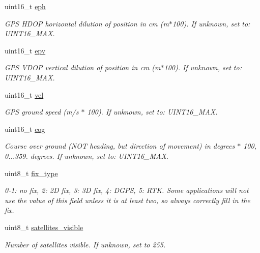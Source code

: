 \begin{DoxyCompactItemize}
uint16\+\_\+t \hyperlink{struct____mavlink__gps__raw__int__t_ad7ec0749ffe37d3ada65b701be2cd305}{eph}
\begin{DoxyCompactList}\small\item\em G\+P\+S H\+D\+O\+P horizontal dilution of position in cm (m$\ast$100). If unknown, set to\+: U\+I\+N\+T16\+\_\+\+M\+A\+X. \end{DoxyCompactList}\item 
uint16\+\_\+t \hyperlink{struct____mavlink__gps__raw__int__t_a0d50bc6cc0e56d9f49885e3e550ec944}{epv}
\begin{DoxyCompactList}\small\item\em G\+P\+S V\+D\+O\+P vertical dilution of position in cm (m$\ast$100). If unknown, set to\+: U\+I\+N\+T16\+\_\+\+M\+A\+X. \end{DoxyCompactList}\item 
uint16\+\_\+t \hyperlink{struct____mavlink__gps__raw__int__t_a77e8cbdbf554637e4fbbdaaabd562eaf}{vel}
\begin{DoxyCompactList}\small\item\em G\+P\+S ground speed (m/s $\ast$ 100). If unknown, set to\+: U\+I\+N\+T16\+\_\+\+M\+A\+X. \end{DoxyCompactList}\item 
uint16\+\_\+t \hyperlink{struct____mavlink__gps__raw__int__t_adbe4dfbea17d1fd08a0841ce29e32637}{cog}
\begin{DoxyCompactList}\small\item\em Course over ground (N\+O\+T heading, but direction of movement) in degrees $\ast$ 100, 0...359. degrees. If unknown, set to\+: U\+I\+N\+T16\+\_\+\+M\+A\+X. \end{DoxyCompactList}\item 
uint8\+\_\+t \hyperlink{struct____mavlink__gps__raw__int__t_ae014afb6eea2b6033ebde37c79e120f2}{fix\+\_\+type}
\begin{DoxyCompactList}\small\item\em 0-\/1\+: no fix, 2\+: 2\+D fix, 3\+: 3\+D fix, 4\+: D\+G\+P\+S, 5\+: R\+T\+K. Some applications will not use the value of this field unless it is at least two, so always correctly fill in the fix. \end{DoxyCompactList}\item 
uint8\+\_\+t \hyperlink{struct____mavlink__gps__raw__int__t_af1481a191aa3ffbf832dc3a4c35cbf09}{satellites\+\_\+visible}
\begin{DoxyCompactList}\small\item\em Number of satellites visible. If unknown, set to 255. \end{DoxyCompactList}\end{DoxyCompactItemize}


